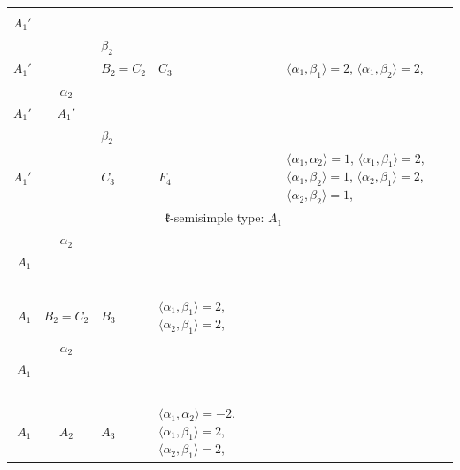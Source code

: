\documentclass[12pt]{report}
\begin{document}
\begin{appendix}
{\begin{longtable}{rcl p{1cm}p{1cm}p{3cm} }
\\
\begin{tabular}{c}2$\alpha_1$\\\tiny{ $A_1'$ }\end{tabular} &\begin{tabular}{c} = \\~ \end{tabular} & \begin{tabular}{cc}$\beta_1$+ & $\beta_2$\\\tiny{ $A_1'$ } & \tiny{  }\end{tabular} & $B_2=C_2$ & $C_3$ &  $\langle\alpha_1, \beta_1\rangle=2$, $\langle\alpha_1, \beta_2\rangle=2$, 
\\
\begin{tabular}{cc}$\alpha_1$+ & $\alpha_2$\\\tiny{ $A_1'$ } & \tiny{ $A_1'$ }\end{tabular} &\begin{tabular}{c} = \\~ \end{tabular} & \begin{tabular}{cc}$\beta_1$+ & $\beta_2$\\\tiny{ $A_1'$ } & \tiny{  }\end{tabular} & $C_3$ & $F_4$ & $\langle\alpha_1, \alpha_2\rangle=1$,  $\langle\alpha_1, \beta_1\rangle=2$, $\langle\alpha_1, \beta_2\rangle=1$, $\langle\alpha_2, \beta_1\rangle=2$, $\langle\alpha_2, \beta_2\rangle=1$, 
\\
\hline\multicolumn{5}{c}{$\mathfrak{k}$-semisimple type: $A_1$}\\
\hline\hline\begin{tabular}{cc}$\alpha_1$+ & $\alpha_2$\\\tiny{ $A_1$ } & \tiny{  }\end{tabular} &\begin{tabular}{c} = \\~ \end{tabular} & \begin{tabular}{c}$\beta_1$\\\tiny{ $A_1$ }\end{tabular} & $B_2=C_2$ & $B_3$ &  $\langle\alpha_1, \beta_1\rangle=2$, $\langle\alpha_2, \beta_1\rangle=2$, 
\\
\begin{tabular}{cc}$\alpha_1$+ & $\alpha_2$\\\tiny{ $A_1$ } & \tiny{  }\end{tabular} &\begin{tabular}{c} = \\~ \end{tabular} & \begin{tabular}{c}$\beta_1$\\\tiny{ $A_1$ }\end{tabular} & $A_2$ & $A_3$ & $\langle\alpha_1, \alpha_2\rangle=-2$,  $\langle\alpha_1, \beta_1\rangle=2$, $\langle\alpha_2, \beta_1\rangle=2$, 

\end{longtable}}
\end{appendix}
\end{document}
